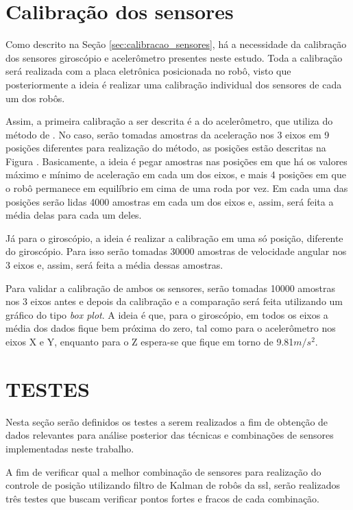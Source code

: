 \documentclass[acronym, symbols, table]{fei}
\begin{document}
	\section{Calibração dos sensores}
	
		Como descrito na Seção \ref{sec:calibracao_sensores}, há a necessidade da calibração dos sensores giroscópio e acelerômetro presentes neste estudo. Toda a calibração será realizada com a placa eletrônica posicionada no robô, visto que posteriormente a ideia é realizar uma calibração individual dos sensores de cada um dos robôs.
		
		Assim, a primeira calibração a ser descrita é a do acelerômetro, que utiliza do método de \textcite{menezes2020triaxial}. No caso, serão tomadas amostras da aceleração nos 3 eixos em 9 posições diferentes para realização do método, as posições estão descritas na Figura . Basicamente, a ideia é pegar amostras nas posições em que há os valores máximo e mínimo de aceleração em cada um dos eixos, e mais 4 posições em que o robô permanece em equilíbrio em cima de uma roda por vez. Em cada uma das posições serão lidas 4000 amostras em cada um dos eixos e, assim, será feita a média delas para cada um deles.
		
		Já para o giroscópio, a ideia é realizar a calibração em uma só posição, diferente do giroscópio. Para isso serão tomadas 30000 amostras de velocidade angular nos 3 eixos e, assim, será feita a média dessas amostras.
		
		Para validar a calibração de ambos os sensores, serão tomadas 10000 amostras nos 3 eixos antes e depois da calibração e a comparação será feita utilizando um gráfico do tipo \textit{box plot}. A ideia é que, para o giroscópio, em todos os eixos a média dos dados fique bem próxima do zero, tal como para o acelerômetro nos eixos X e Y, enquanto para o Z espera-se que fique em torno de 9.81$m/s^{2}$.
	
	\section{TESTES}
	
		Nesta seção serão definidos os testes a serem realizados a fim de obtenção de dados relevantes para análise posterior das técnicas e combinações de sensores implementadas neste trabalho.
		
		A fim de verificar qual a melhor combinação de sensores para realização do controle de posição utilizando filtro de Kalman de robôs da \acrshort{ssl}, serão realizados três testes que buscam verificar pontos fortes e fracos de cada combinação.
		
\end{document}
